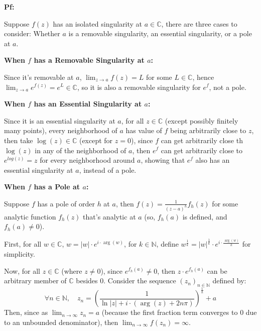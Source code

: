 \documentclass{article}
\begin{document}
\textbf{Pf:}

Suppose $f(z)$ has an isolated singularity at $a\in\mathbb{C}$, there are three cases to consider:
Whether $a$ is a removable singularity, an essential singularity, or a pole at $a$.

\hfill

\textbf{When $f$ has a Removable Singularity at $a$:}

Since it's removable at $a$, $\lim_{z\rightarrow a}f(z) = L$ for some $L\in\mathbb{C}$, hence $\lim_{z\rightarrow a}e^{f(z)}=e^L\in\mathbb{C}$,
so it is also a removable singularity for $e^f$, not a pole.

\hfill

\textbf{When $f$ has an Essential Singularity at $a$:}

Since it is an essential singularity at $a$, for all $z\in\mathbb{C}$ (except possibly finitely many points), every neighborhood of $a$ has value of $f$
being arbitrarily close to $z$, then take $\log(z)\in\mathbb{C}$ (except for $z=0$), since $f$ can get arbitrarily close th $\log(z)$ in any of the neighborhood of $a$,
then $e^f$ can get arbitrarily close to $e^{log(z)} = z$ for every neighborhood around $a$, showing that $e^f$ also has an essential singularity at $a$, instead of a pole.

\hfill

\textbf{When $f$ has a Pole at $a$:}

Suppose $f$ has a pole of order $h$ at $a$, then $f(z)=\frac{1}{(z-a)^h}f_h(z)$ for some analytic function $f_h(z)$ that's analytic at $a$ (so, $f_h(a)$ is defined, and $f_h(a)\neq 0$).

First, for all $w\in\mathbb{C}$, $w=|w|\cdot e^{i\cdot \arg(w)}$, for $k\in\mathbb{N}$, define $w^\frac{1}{k} = |w|^\frac{1}{k}\cdot e^{i\cdot\frac{\arg(w)}{k}}$ for simplicity.

Now, for all $z\in\mathbb{C}$ (where $z\neq 0$), since $e^{f_h(a)}\neq 0$, then $z\cdot e^{f_h(a)}$ can be arbitrary member of $\mathbb{C}$ besides $0$. Consider the sequence $(z_n)_{n\in\mathbb{N}}$ defined by:
$$\forall n\in\mathbb{N},\quad z_n=\left(\frac{1}{\ln|z|+i\cdot(\arg(z)+2n\pi)}\right)^\frac{1}{h}+a$$
Then, since as $\lim_{n\rightarrow\infty}z_n=a$ (because the first fraction term converges to $0$ due to an unbounded denominator), then $\lim_{n\rightarrow\infty}f(z_n)=\infty$.
\end{document}
